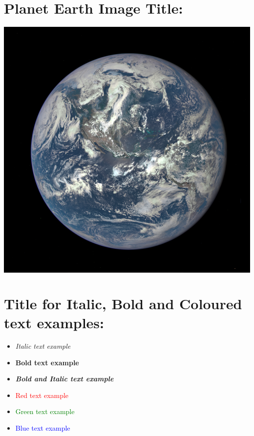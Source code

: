 \documentclass[12pt]{article} %
\begin{document}
\section*{Planet Earth Image Title:}
\begin{flushleft}
\includegraphics{earth.png} %
\end{flushleft}


\newpage


\section*{Title for Italic, Bold and Coloured text examples:} %
\begin{flushleft}
\begin{itemize}
\item\textit{Italic text example}
\item\textbf{Bold text example}
\item\textit{\textbf{Bold and Italic text example}}
\item \textcolor{red}{Red text example}
\item \textcolor{green}{Green text example}
\item \textcolor{blue}{Blue text example}
\end{itemize}
\end{flushleft}


\end{document}
